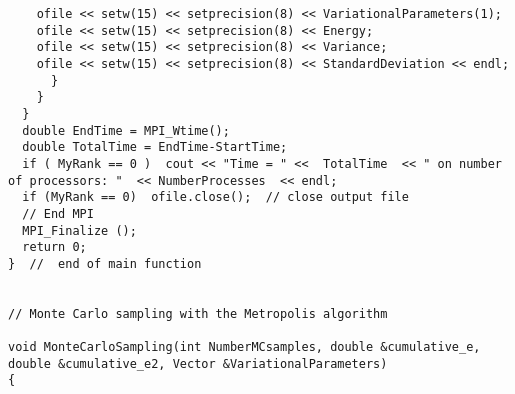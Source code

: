 \documentclass{beamer}
\begin{document}
\begin{frame}
\begin{block}{}
\begin{verbatim}
	ofile << setw(15) << setprecision(8) << VariationalParameters(1);
	ofile << setw(15) << setprecision(8) << Energy;
	ofile << setw(15) << setprecision(8) << Variance;
	ofile << setw(15) << setprecision(8) << StandardDeviation << endl;
      }
    }
  }
  double EndTime = MPI_Wtime();
  double TotalTime = EndTime-StartTime;
  if ( MyRank == 0 )  cout << "Time = " <<  TotalTime  << " on number of processors: "  << NumberProcesses  << endl;
  if (MyRank == 0)  ofile.close();  // close output file
  // End MPI
  MPI_Finalize ();  
  return 0;
}  //  end of main function


// Monte Carlo sampling with the Metropolis algorithm  

void MonteCarloSampling(int NumberMCsamples, double &cumulative_e, double &cumulative_e2, Vector &VariationalParameters)
{


\end{verbatim}
\end{block}
\end{frame}
\end{document}
